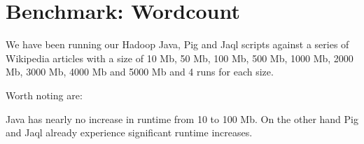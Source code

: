\section{Benchmark: Wordcount}            

We have been running our Hadoop Java, Pig and Jaql scripts against a series of Wikipedia articles with a size of 10 Mb, 50 Mb, 100 Mb, 500 Mb, 1000 Mb, 2000 Mb, 3000 Mb, 4000 Mb and 5000 Mb and 4 runs for each size.


Worth noting are:

Java has nearly no increase in runtime from 10 to 100 Mb. On the other hand Pig and Jaql already experience significant runtime increases.